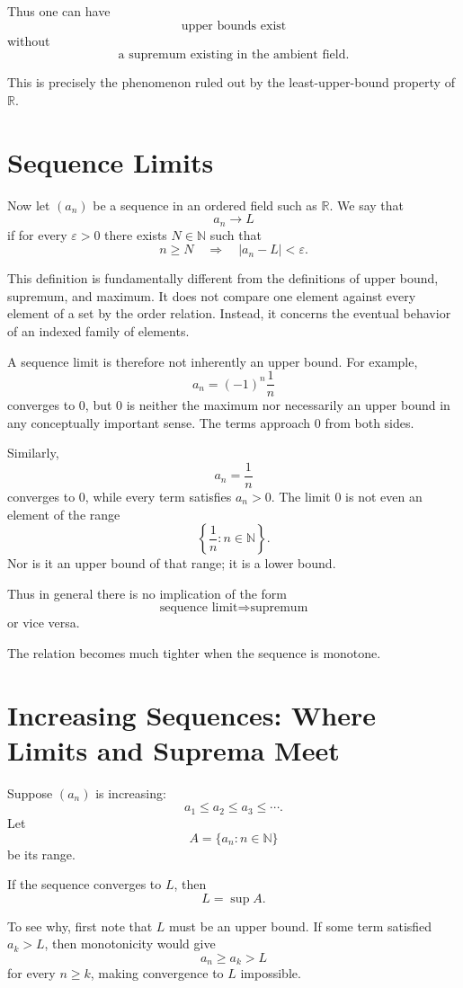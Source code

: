 \documentclass{essay}
\begin{document}
Thus one can have
\[
    \text{upper bounds exist}
\]
without
\[
    \text{a supremum existing in the ambient field}.
\]

This is precisely the phenomenon ruled out by the least-upper-bound property of $\mathbb{R}$.

\section{Sequence Limits}

Now let $(a_n)$ be a sequence in an ordered field such as $\mathbb{R}$. We say that
\[
    a_n\to L
\]
if for every $\varepsilon>0$ there exists $N\in\mathbb{N}$ such that
\[
    n\geq N
    \quad\Longrightarrow\quad
    |a_n-L|<\varepsilon.
\]

This definition is fundamentally different from the definitions of upper bound, supremum, and maximum. It does not compare one element against every element of a set by the order relation. Instead, it concerns the eventual behavior of an indexed family of elements.

A sequence limit is therefore not inherently an upper bound. For example,
\[
    a_n=(-1)^n\frac1n
\]
converges to $0$, but $0$ is neither the maximum nor necessarily an upper bound in any conceptually important sense. The terms approach $0$ from both sides.

Similarly,
\[
    a_n=\frac1n
\]
converges to $0$, while every term satisfies $a_n>0$. The limit $0$ is not even an element of the range
\[
    \left\{\frac1n:n\in\mathbb{N}\right\}.
\]
Nor is it an upper bound of that range; it is a lower bound.

Thus in general there is no implication of the form
\[
    \text{sequence limit}\Longrightarrow\text{supremum}
\]
or vice versa.

The relation becomes much tighter when the sequence is monotone.

\section{Increasing Sequences: Where Limits and Suprema Meet}

Suppose $(a_n)$ is increasing:
\[
    a_1\leq a_2\leq a_3\leq\cdots.
\]
Let
\[
    A=\{a_n:n\in\mathbb{N}\}
\]
be its range.

If the sequence converges to $L$, then
\[
    L=\sup A.
\]

To see why, first note that $L$ must be an upper bound. If some term satisfied $a_k>L$, then monotonicity would give
\[
    a_n\geq a_k>L
\]
for every $n\geq k$, making convergence to $L$ impossible.
\end{document}
